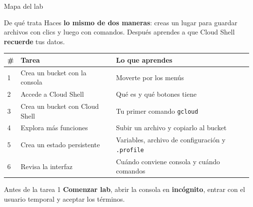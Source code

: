 \documentclass[aspectratio=169,10pt,c]{beamer}
\begin{document}
\begin{frame}{Mapa del lab}
\begin{block}{De qué trata}
\small Haces \textbf{lo mismo de dos maneras}: creas un lugar para guardar archivos con clics y luego con comandos. Después aprendes a que Cloud Shell \textbf{recuerde} tus datos.
\end{block}
\renewcommand{\arraystretch}{1.25}
\centering\small
\begin{tabular}{@{}p{0.7cm}p{5.4cm}p{6.6cm}@{}}
\toprule
\textbf{\#} & \textbf{Tarea} & \textbf{Lo que aprendes}\\
\midrule
1 & Crea un bucket con la consola & Moverte por los menús\\
2 & Accede a Cloud Shell & Qué es y qué botones tiene\\
3 & Crea un bucket con Cloud Shell & Tu primer comando \texttt{gcloud}\\
4 & Explora más funciones & Subir un archivo y copiarlo al bucket\\
5 & Crea un estado persistente & Variables, archivo de configuración y \texttt{.profile}\\
6 & Revisa la interfaz & Cuándo conviene consola y cuándo comandos\\
\bottomrule
\end{tabular}
\par\vspace{2mm}
\begin{alertblock}{Antes de la tarea 1}
\small \textbf{Comenzar lab}, abrir la consola en \textbf{incógnito}, entrar con el usuario temporal y aceptar los términos.
\end{alertblock}
\end{frame}
\end{document}
